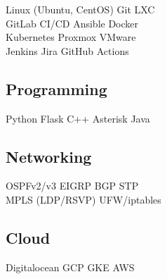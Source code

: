 \documentclass[letterpaper]{deedy-resume} %
\begin{document}
\begin{minipage}[t]{0.33\textwidth}
Linux (Ubuntu, CentOS) \textbullet{} Git \textbullet{}  LXC \\
GitLab CI/CD \textbullet{}  Ansible \textbullet{}  Docker \\ 
Kubernetes \textbullet{}  Proxmox \textbullet{}  VMware \\
Jenkins \textbullet{} Jira \textbullet{} GitHub Actions

\sectionspace %

\subsection{Programming}

Python \textbullet{} Flask \textbullet{} C++ \textbullet{} Asterisk \textbullet{}  Java \\ 
 
\sectionspace %

\subsection{Networking}

OSPFv2/v3 \textbullet{} EIGRP \textbullet{} BGP \textbullet{} STP \\ 
MPLS (LDP/RSVP) \textbullet{} UFW/iptables

\sectionspace %

\subsection{Cloud}

Digitalocean \textbullet{} GCP \textbullet{} GKE \textbullet{} AWS \\

\sectionspace %



\end{minipage} %
\hfill
%
%
\end{document}
